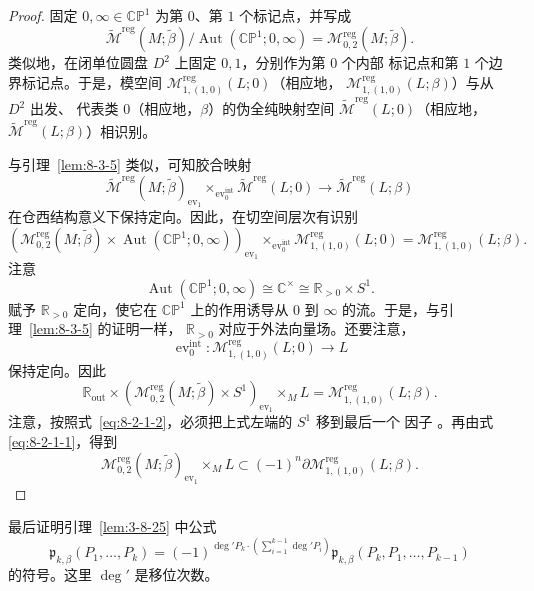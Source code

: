 \begin{proof}
固定 $0,\infty\in\mathbb{CP}^1$ 为第 $0$、第 $1$ 个标记点，并写成
\[
 \widetilde{\mathcal M}^{\mathrm{reg}}(M;\widetilde\beta)
 /\operatorname{Aut}(\mathbb{CP}^1;0,\infty)
 =\mathcal M_{0,2}^{\mathrm{reg}}(M;\widetilde\beta).
\]
类似地，在闭单位圆盘 $D^2$ 上固定 $0,1$，分别作为第 $0$ 个内部
标记点和第 $1$ 个边界标记点。于是，模空间
$\mathcal M_{1,(1,0)}^{\mathrm{reg}}(L;0)$（相应地，
$\mathcal M_{1,(1,0)}^{\mathrm{reg}}(L;\beta)$）与从 $D^2$ 出发、
代表类 $0$（相应地，$\beta$）的伪全纯映射空间
$\widetilde{\mathcal M}^{\mathrm{reg}}(L;0)$（相应地，
$\widetilde{\mathcal M}^{\mathrm{reg}}(L;\beta)$）相识别。

与引理~\ref{lem:8-3-5} 类似，可知胶合映射
\[
 \widetilde{\mathcal M}^{\mathrm{reg}}(M;\widetilde\beta)_{
 \operatorname{ev}_1}
 \mathop{\times}_{\operatorname{ev}_0^{\mathrm{int}}}
 \widetilde{\mathcal M}^{\mathrm{reg}}(L;0)
 \longrightarrow
 \widetilde{\mathcal M}^{\mathrm{reg}}(L;\beta)
\]
在仓西结构意义下保持定向。因此，在切空间层次有识别
\[
 \left(
 \mathcal M_{0,2}^{\mathrm{reg}}(M;\widetilde\beta)
 \times\operatorname{Aut}(\mathbb{CP}^1;0,\infty)
 \right)_{\operatorname{ev}_1}
 \mathop{\times}_{\operatorname{ev}_0^{\mathrm{int}}}
 \mathcal M_{1,(1,0)}^{\mathrm{reg}}(L;0)
 =\mathcal M_{1,(1,0)}^{\mathrm{reg}}(L;\beta).
\]
注意
\[
 \operatorname{Aut}(\mathbb{CP}^1;0,\infty)
 \cong\mathbb C^\times\cong\mathbb R_{>0}\times S^1.
\]
赋予 $\mathbb R_{>0}$ 定向，使它在 $\mathbb{CP}^1$ 上的作用诱导从
$0$ 到 $\infty$ 的流。于是，与引理~\ref{lem:8-3-5} 的证明一样，
$\mathbb R_{>0}$ 对应于外法向量场。还要注意，
\[
 \operatorname{ev}_0^{\mathrm{int}}\colon
 \mathcal M_{1,(1,0)}^{\mathrm{reg}}(L;0)\longrightarrow L
\]
保持定向。因此
\[
 \mathbb R_{\mathrm{out}}\times
 \left(\mathcal M_{0,2}^{\mathrm{reg}}(M;\widetilde\beta)
 \times S^1\right)_{\operatorname{ev}_1}
 \mathbin{\times_M}L
 =\mathcal M_{1,(1,0)}^{\mathrm{reg}}(L;\beta).
\]
注意，按照式~\eqref{eq:8-2-1-2}，必须把上式左端的 $S^1$ 移到最后一个
因子
。再由式
\eqref{eq:8-2-1-1}，得到
\[
 \mathcal M_{0,2}^{\mathrm{reg}}(M;\widetilde\beta)_{
 \operatorname{ev}_1}\mathbin{\times_M}L
 \subset(-1)^n\partial
 \mathcal M_{1,(1,0)}^{\mathrm{reg}}(L;\beta).
\]
\end{proof}

最后证明引理~\ref{lem:3-8-25} 中公式
\[
 \mathfrak p_{k,\beta}(P_1,\ldots,P_k)
 =(-1)^{\deg'P_k\cdot
 (\sum_{i=1}^{k-1}\deg'P_i)}
 \mathfrak p_{k,\beta}(P_k,P_1,\ldots,P_{k-1})
\]
的符号。这里 $\deg'$ 是移位次数。

